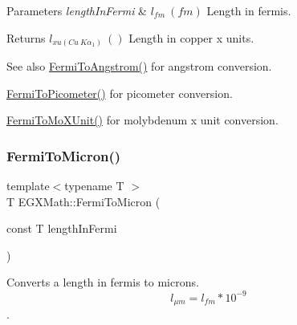 \begin{DoxyParams}{Parameters}
{\em length\+In\+Fermi} & $ l_{fm}\ (fm)$ Length in fermis. \\
\hline
\end{DoxyParams}
\begin{DoxyReturn}{Returns}
$ l_{xu(Cu\ K\alpha_1)}\ ()$ Length in copper x units. 
\end{DoxyReturn}
\begin{DoxySeeAlso}{See also}
\mbox{\hyperlink{group___e_g_x_math-_conversions-_length_conversions-_non-_s_i-_fermi-_non-_s_i_ga9bec1d5936dfd3fa360cf3484685cc23}{Fermi\+To\+Angstrom()}} for angstrom conversion. 

\mbox{\hyperlink{group___e_g_x_math-_conversions-_length_conversions-_non-_s_i-_fermi-_s_i_ga9d12cf46e802908b3ee6f6e1c4d8047e}{Fermi\+To\+Picometer()}} for picometer conversion. 

\mbox{\hyperlink{group___e_g_x_math-_conversions-_length_conversions-_non-_s_i-_fermi-_non-_s_i_ga8555a46e14c4a759e0b04a54485d679e}{Fermi\+To\+Mo\+X\+Unit()}} for molybdenum x unit conversion. 
\end{DoxySeeAlso}
\mbox{\label{group___e_g_x_math-_conversions-_length_conversions-_non-_s_i-_fermi-_non-_s_i_ga8a55f7fbfb5e78f8b22efaeaac18f63b}} 
\subsubsection{\texorpdfstring{Fermi\+To\+Micron()}{FermiToMicron()}}
{\footnotesize\ttfamily template$<$typename T $>$ \\
T E\+G\+X\+Math\+::\+Fermi\+To\+Micron (\begin{DoxyParamCaption}\item[{const T}]{length\+In\+Fermi }\end{DoxyParamCaption})}



Converts a length in fermis to microns. \[ l_{\mu m}=l_{fm} * 10^{-9} \]. 


